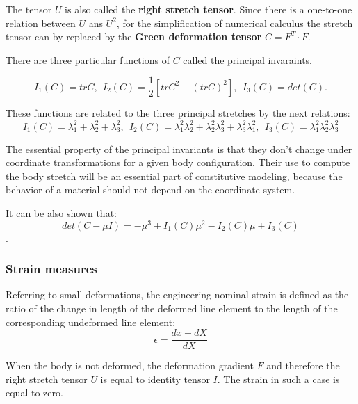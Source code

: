 The tensor $U$ is also called the \textbf{right stretch tensor}.  Since there is a one-to-one relation between $U$ ans $U^2$, for the simplification of numerical calculus the stretch tensor can by replaced by the \textbf{Green deformation tensor} $C = F^T \cdot F$.



There are three particular functions of $C$ called the principal invaraints. 

\begin{equation}
\label{principal_invariants}
I_1(C) = tr C, \ \ I_2(C)=\frac{1}{2}\left[ trC^2 - \left(tr C \right)^2 \right], \ \ I_3(C)=det(C) .
\end{equation} 

These functions are related to the three principal stretches by the next relations:
\begin{equation}
\label{principalstrechinvariantsrelation}
I_1(C) = \lambda_1^2+\lambda_2^2+\lambda_3^2, \ \ I_2(C) = \lambda_1^2 \lambda_2^2 + \lambda_2^2 \lambda_3^2+ \lambda_3^2 \lambda_1^2, \ \ I_3(C) = \lambda_1^2 \lambda_2^2 \lambda_3^2
\end{equation}

The essential property of the principal invariants is that they don't change under coordinate transformations for a given body configuration. Their use to compute the body stretch will be an essential part of constitutive modeling, because the behavior of a material should not depend on the coordinate system.

It can be also shown that:
\begin{equation}
\label{eq:detinvariantrelation}
det(C-\mu I) = -\mu ^3+I_1(C)\mu ^2-I_2(C)\mu +I_3(C)
\end{equation}. 



\subsubsection*{Strain measures}\label{strainmeasure}
Referring to small deformations, the engineering nominal strain is defined as the ratio of the change in length of the deformed line element to the length of the corresponding undeformed line element:  
\begin{equation}
\epsilon = \frac{ dx  - dX }{	dX }
\end{equation}

When the body is not deformed, the deformation gradient $F$ and therefore the right stretch tensor $U$ is equal to identity tensor $I$. The strain in such a case is equal to zero. 

